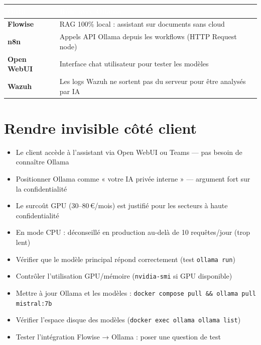 \documentclass[11pt, a4paper]{article}
\begin{document}
\begin{center}
\renewcommand{\arraystretch}{1.4}
\begin{tabularx}{\linewidth}{>{\bfseries}p{2.8cm} X}
\toprule
\rowcolor{tabheader}
\textcolor{white}{\textbf{Outil}} & \textcolor{white}{\textbf{Rôle avec Ollama}} \\
\midrule
Flowise & RAG 100\% local : assistant sur documents sans cloud \\
\rowcolor{rowgray}
n8n & Appels API Ollama depuis les workflows (HTTP Request node) \\
Open WebUI & Interface chat utilisateur pour tester les modèles \\
\rowcolor{rowgray}
Wazuh & Les logs Wazuh ne sortent pas du serveur pour être analysés par IA \\
\bottomrule
\end{tabularx}
\end{center}

\section{Rendre invisible côté client}

\begin{itemize}
  \item Le client accède à l'assistant via Open WebUI ou Teams — pas besoin de connaître Ollama
  \item Positionner Ollama comme « votre IA privée interne » — argument fort sur la confidentialité
  \item Le surcoût GPU (30–80\,€/mois) est justifié pour les secteurs à haute confidentialité
  \item En mode CPU : déconseillé en production au-delà de 10 requêtes/jour (trop lent)
\end{itemize}

\begin{checklist}
  \begin{itemize}
    \item[$\square$] Vérifier que le modèle principal répond correctement (test \texttt{ollama run})
    \item[$\square$] Contrôler l'utilisation GPU/mémoire (\texttt{nvidia-smi} si GPU disponible)
    \item[$\square$] Mettre à jour Ollama et les modèles : \texttt{docker compose pull \&\& ollama pull mistral:7b}
    \item[$\square$] Vérifier l'espace disque des modèles (\texttt{docker exec ollama ollama list})
    \item[$\square$] Tester l'intégration Flowise → Ollama : poser une question de test
  \end{itemize}
\end{checklist}
\end{document}
